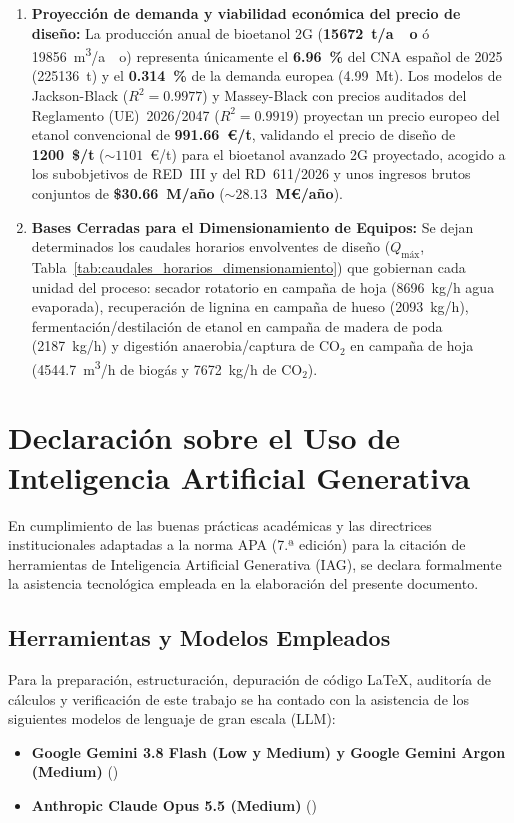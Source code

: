 \documentclass{report}
\begin{document}
\begin{enumerate}
    \item \textbf{Proyección de demanda y viabilidad económica del precio de diseño:} La producción anual de bioetanol 2G (\textbf{\SI{15672}{\tonne/ao}} ó \SI{19856}{\cubic\meter/ao}) representa únicamente el \textbf{\SI{6.96}{\percent}} del CNA español de 2025 (\num{225136}~t) y el \textbf{\SI{0.314}{\percent}} de la demanda europea (\num{4.99}~Mt). Los modelos de Jackson-Black ($R^2 = \num{0.9977}$) y Massey-Black con precios auditados del Reglamento (UE)~2026/2047 ($R^2 = \num{0.9919}$) proyectan un precio europeo del etanol convencional de \textbf{\num{991.66}~€/t}, validando el precio de diseño de \textbf{\num{1200}~\$/t} ($\sim \num{1101}$~€/t) para el bioetanol avanzado 2G proyectado, acogido a los subobjetivos de RED~III y del RD~611/2026 y unos ingresos brutos conjuntos de \textbf{\$\num{30.66}~M/año} (\textbf{$\sim \num{28.13}$~M€/año}).
    \item \textbf{Bases Cerradas para el Dimensionamiento de Equipos:} Se dejan determinados los caudales horarios envolventes de diseño ($Q_{\text{máx}}$, Tabla~\ref{tab:caudales_horarios_dimensionamiento}) que gobiernan cada unidad del proceso: secador rotatorio en campaña de hoja (\SI{8696}{\kilo\gram/\hour} agua evaporada), recuperación de lignina en campaña de hueso (\SI{2093}{\kilo\gram/\hour}), fermentación/destilación de etanol en campaña de madera de poda (\SI{2187}{\kilo\gram/\hour}) y digestión anaerobia/captura de $\text{CO}_2$ en campaña de hoja (\SI{4544.7}{\cubic\meter/\hour} de biogás y \SI{7672}{\kilo\gram/\hour} de $\text{CO}_2$).
\end{enumerate}

\newpage
\chapter*{Declaración sobre el Uso de Inteligencia Artificial Generativa}

En cumplimiento de las buenas prácticas académicas y las directrices institucionales adaptadas a la norma APA (7.ª edición) para la citación de herramientas de Inteligencia Artificial Generativa (IAG), se declara formalmente la asistencia tecnológica empleada en la elaboración del presente documento.

\section*{Herramientas y Modelos Empleados}
Para la preparación, estructuración, depuración de código LaTeX, auditoría de cálculos y verificación de este trabajo se ha contado con la asistencia de los siguientes modelos de lenguaje de gran escala (LLM):
\begin{itemize}
    \item \textbf{Google Gemini 3.8 Flash (Low y Medium) y Google Gemini Argon (Medium)} (\cite{google_gemini_2026})
    \item \textbf{Anthropic Claude Opus 5.5 (Medium)} (\cite{anthropic_claude_2026})
\end{itemize}
\end{document}
